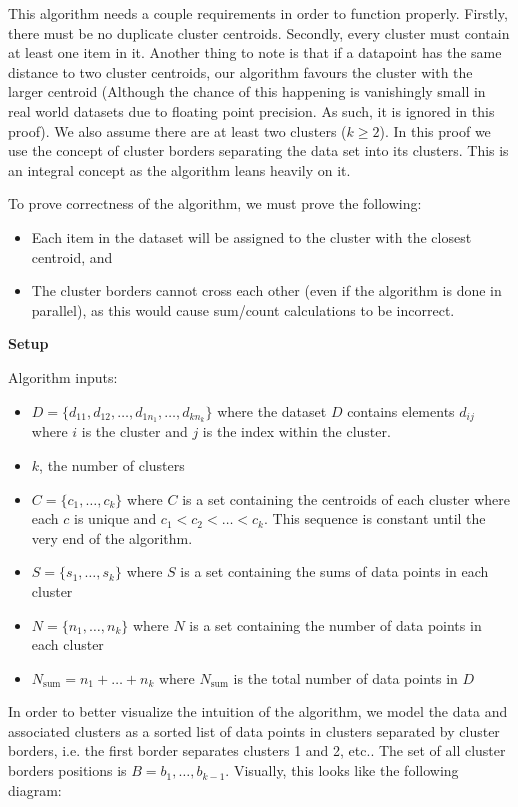 \documentclass[conference]{IEEEtran}
\begin{document}
This algorithm needs a couple requirements in order to function properly. Firstly, there must be no duplicate cluster centroids. Secondly, every cluster must contain at least one item in it. Another thing to note is that if a datapoint has the same distance to two cluster centroids, our algorithm favours the cluster with the larger centroid (Although the chance of this happening is vanishingly small in real world datasets due to floating point precision. As such, it is ignored in this proof). We also assume there are at least two clusters ($k \geq 2$). In this proof we use the concept of cluster borders separating the data set into its clusters. This is an integral concept as the algorithm leans heavily on it.

To prove correctness of the algorithm, we must prove the following:
\begin{itemize}
\item Each item in the dataset will be assigned to the cluster with the closest centroid, and
\item The cluster borders cannot cross each other (even if the algorithm is done in parallel), as this would cause sum/count calculations to be incorrect.
\end{itemize}

\textbf{Setup}

Algorithm inputs:
\begin{itemize}
\item $D = \{d_{11}, d_{12}, \dots , d_{1n_1}, \dots, d_{kn_k}\}$ where the dataset $D$ contains elements $d_{ij}$ where $i$ is the cluster and $j$ is the index within the cluster. 
\item $k$, the number of clusters
\item $C = \{c_1, \dots, c_k\}$ where $C$ is a set containing the centroids of each cluster where each $c$ is unique and $c_1 < c_2 < \dots < c_k$. This sequence is constant until the very end of the algorithm.
\item $S = \{s_1, \dots, s_k\}$ where $S$ is a set containing the sums of data points in each cluster
\item $N = \{n_1, \dots, n_k\}$ where $N$ is a set containing the number of data points in each cluster
\item $N_{\text{sum}} = {n_1 + \dots + n_k}$ where $N_{\text{sum}}$ is the total number of data points in $D$
\end{itemize}

In order to better visualize the intuition of the algorithm, we model the data and associated clusters as a sorted list of data points in clusters separated by cluster borders, i.e. the first border separates clusters 1 and 2, etc.. The set of all cluster borders positions is $B = b_1, \dots, b_{k-1}$. Visually, this looks like the following diagram:
\end{document}
